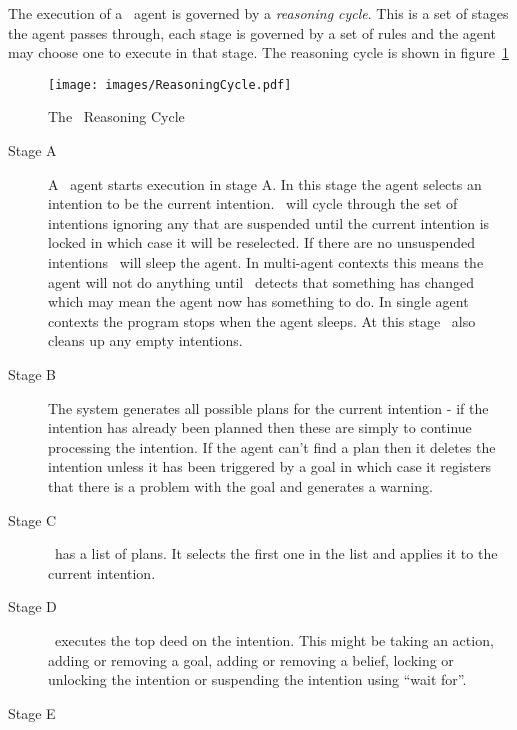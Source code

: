 The execution of a \gwendolen\ agent is governed by a \emph{reasoning
  cycle}.  This is a set of stages the agent passes through, each
stage is governed by a set of rules and the agent may choose one to
execute in that stage.  The reasoning cycle is shown in
figure~\ref{fig:reasoning_cycle} 
\begin{figure}
\texttt{[image: images/ReasoningCycle.pdf]}
\caption{The \gwendolen\ Reasoning Cycle}
\label{fig:reasoning_cycle}
\end{figure}
\begin{description}
\item[Stage A]
A \gwendolen\ agent starts execution in stage A.  In this stage the
agent selects an intention to be the current
intention.  \gwendolen\ will
cycle through the set of intentions ignoring any that are
suspended until the current intention is
locked in which case it will be reselected.
If there are no unsuspended intentions \gwendolen\ will sleep the
agent.  In multi-agent contexts this means the agent
will not do anything until \gwendolen\ detects that something has
changed which may mean the agent now has something to do.  In single
agent contexts the program stops when the agent sleeps.  At this stage
\gwendolen\ also cleans up any empty
intentions. 
\item[Stage B]
The system generates all possible plans for the current intention - if
the intention has already been planned then these are simply to
continue processing the intention.  If the agent can't find a plan
then it deletes the intention unless it has been triggered by a goal
in which case it registers that there is a problem with the goal and
generates a
warning. 
\item[Stage C]
\gwendolen\ has a list of plans.  It selects the first one in the list
and applies it to the current
intention. 
\item[Stage D]
\gwendolen\ executes the top deed on the intention.  This might be
taking an action, adding or removing a goal, adding or removing a
belief, locking or unlocking the intention or suspending the intention
using ``wait
for''. 
\item[Stage E]

\end{description}

